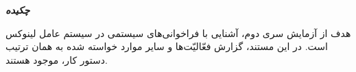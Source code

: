 \chapter*{}
\begin{center}
\emph{\textbf{چکیده}}
\end{center}


هدف از آزمایش سری دوم، آشنایی با فراخوانی‌های سیستمی در سیستم عامل لینوکس است. در این مستند، گزارش فعّالیّت‌ها و سایر موارد خواسته شده به همان ترتیب دستور کار، موجود هستند.

\newpage

